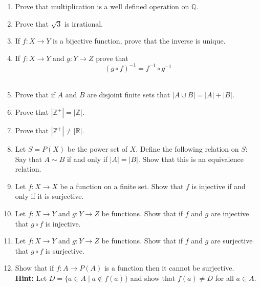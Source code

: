 \documentclass[12pt,letterpaper]{article}
\newcommand{\rr}{\mathbb R}     %
\newcommand{\zz}{\mathbb Z}    %
\theoremstyle{plain}
\theoremstyle{definition}
\begin{document}
\begin{enumerate}[1.]
\ \\ 
\item  Prove that multiplication is a well defined operation on $\mathbb{Q}$.
\ \\
\item Prove that $\sqrt{3}$ is irrational. 
\ \\
\item If $f:X\rightarrow Y$ is a bijective function, prove that the inverse is unique. 
\ \\
\item If $f:X\rightarrow Y$ and $g:Y\rightarrow Z$ prove that 
\[(g\circ f)^{-1}=f^{-1}\circ g^{-1}\]
\ \\
\item Prove that if $A$ and $B$ are disjoint finite sets that $|A\cup B|=|A|+|B|$.
\ \\
\item Prove that $|\zz^+|=|\zz|$.
\ \\
\item Prove that $|\zz^+| \neq |\rr|$.
\ \\
\item Let $S=P(X)$ be the power set of $X$. Define the following relation on $S$: Say that $A\sim B$ if and only if $|A|=|B|$. Show that this is an equivalence relation. 
\ \\
\item Let $f:X\rightarrow X$ be a function on a finite set. Show that $f$ is injective if and only if it is surjective.
\ \\
\item Let $f:X\rightarrow Y$ and $g:Y\rightarrow Z$ be functions. Show that if $f$ and $g$ are injective that $g\circ f$ is injective. 
\ \\
\item Let $f:X\rightarrow Y$ and $g:Y\rightarrow Z$ be functions. Show that if $f$ and $g$ are surjective that $g\circ f$ is surjective. 
\ \\
\item Show that if $f:A\rightarrow P(A)$ is a function then it cannot be surjective. \\
{\bf Hint:} Let $D=\{a\in A\mid a\not\in f(a)\}$ and show that $f(a)\neq D$ for all $a\in A$.
\ \\
\end{enumerate}
\end{document}
